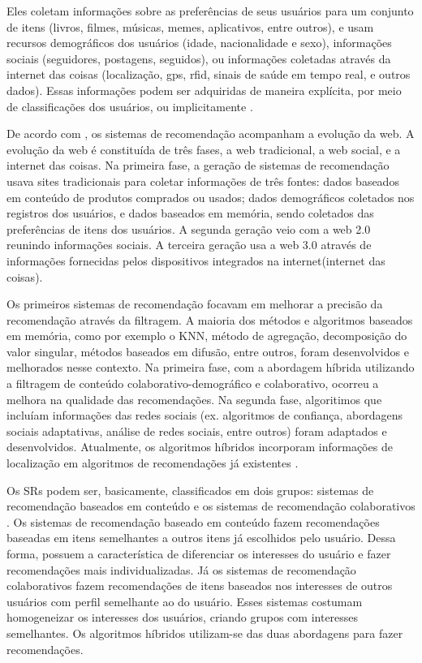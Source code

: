Eles coletam informações sobre as preferências 
de seus usuários para um conjunto de itens (livros, filmes, músicas, 
memes, aplicativos, entre outros), e usam recursos demográficos dos 
usuários (idade, nacionalidade e sexo), informações sociais 
(seguidores, postagens, seguidos), ou informações coletadas através da 
internet das coisas (localização, gps, rfid, sinais de saúde em tempo 
real, e outros dados). Essas informações podem ser adquiridas de maneira 
explícita, por meio de classificações dos usuários, ou implicitamente 
\cite{bobadilla2013}.

De acordo com , os sistemas de recomendação 
acompanham a evolução da web. A evolução da web é constituída de três 
fases, a web tradicional, a web social, e a internet das coisas. 
Na primeira fase, a geração de sistemas de recomendação usava 
sites tradicionais para coletar informações de três fontes: dados 
baseados em conteúdo de produtos comprados ou usados; dados 
demográficos coletados nos registros dos usuários, e dados baseados em 
memória, sendo coletados das preferências de itens dos usuários. A segunda 
geração veio com a web 2.0 reunindo informações sociais. A terceira 
geração usa a web 3.0 através de informações fornecidas pelos dispositivos 
integrados na internet(internet das coisas).

Os primeiros sistemas de recomendação focavam em melhorar a precisão da 
recomendação através da filtragem. A maioria dos métodos e algoritmos 
baseados em memória, como por exemplo o KNN, método de agregação, decomposição do valor 
singular, métodos baseados em difusão, entre outros, foram
desenvolvidos e melhorados nesse contexto. Na primeira fase, com a 
abordagem híbrida utilizando a filtragem de conteúdo 
colaborativo-demográfico e colaborativo, ocorreu a melhora na qualidade 
das recomendações. Na segunda fase, algoritimos que incluíam informações 
das redes sociais (ex. algoritmos de
confiança, abordagens sociais adaptativas, análise de redes sociais, 
entre outros) foram adaptados e 
desenvolvidos. Atualmente, os algoritmos híbridos incorporam informações 
de localização em algoritmos de recomendações já existentes \cite{bobadilla2013}. 

Os SRs podem ser, basicamente, classificados em dois grupos: sistemas de recomendação baseados	
em conteúdo e os sistemas de recomendação colaborativos \cite{mauricio}. Os sistemas
de recomendação baseado em conteúdo fazem recomendações baseadas em itens semelhantes
a outros itens já escolhidos pelo usuário. Dessa forma, possuem a característica de
diferenciar os interesses do usuário e fazer recomendações mais individualizadas. Já os 
sistemas de recomendação colaborativos fazem recomendações de itens baseados nos interesses 
de outros usuários com perfil semelhante ao do usuário. Esses sistemas costumam homogeneizar
os interesses dos usuários, criando grupos com interesses semelhantes. Os algoritmos híbridos 
utilizam-se das duas abordagens para fazer recomendações.


